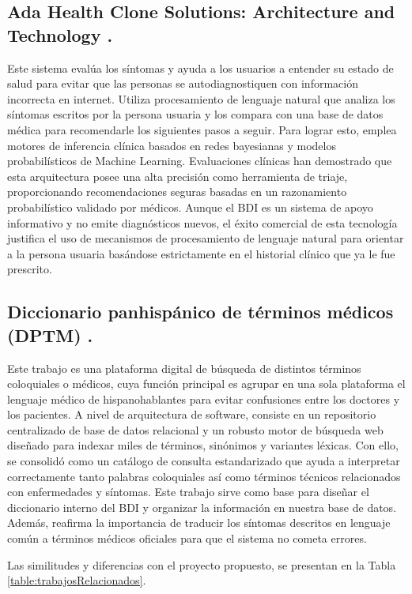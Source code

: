 \subsection{Ada Health Clone Solutions: Architecture and Technology \cite{AdaHealthApp}.}
Este sistema evalúa los síntomas y ayuda a los usuarios a entender su estado de salud para evitar que las personas se autodiagnostiquen con información incorrecta en internet. Utiliza procesamiento de lenguaje natural que analiza los síntomas escritos por la persona usuaria y los compara con una base de datos médica para recomendarle los siguientes pasos a seguir. Para lograr esto, emplea motores de inferencia clínica basados en redes bayesianas y modelos probabilísticos de Machine Learning. Evaluaciones clínicas han demostrado que esta arquitectura posee una alta precisión como herramienta de triaje, proporcionando recomendaciones seguras basadas en un razonamiento probabilístico validado por médicos. Aunque el BDI es un sistema de apoyo informativo y no emite diagnósticos nuevos, el éxito comercial de esta tecnología justifica el uso de mecanismos de procesamiento de lenguaje natural para orientar a la persona usuaria basándose estrictamente en el historial clínico que ya le fue prescrito.

\subsection{Diccionario panhispánico de términos médicos ({DPTM}) \cite{DPTM}.}
Este trabajo es una plataforma digital de búsqueda de distintos términos coloquiales o médicos, cuya función principal es agrupar en una sola plataforma el lenguaje médico de hispanohablantes para evitar confusiones entre los doctores y los pacientes. A nivel de arquitectura de software, consiste en un repositorio centralizado de base de datos relacional y un robusto motor de búsqueda web diseñado para indexar miles de términos, sinónimos y variantes léxicas. Con ello, se consolidó como un catálogo de consulta estandarizado que ayuda a interpretar correctamente tanto palabras coloquiales así como términos técnicos relacionados con enfermedades y síntomas. Este trabajo sirve como base para diseñar el diccionario interno del BDI y organizar la información en nuestra base de datos. Además, reafirma la importancia de traducir los síntomas descritos en lenguaje común a términos médicos oficiales para que el sistema no cometa errores.

Las similitudes y diferencias con el proyecto propuesto, se presentan en la Tabla \ref{table:trabajosRelacionados}.

